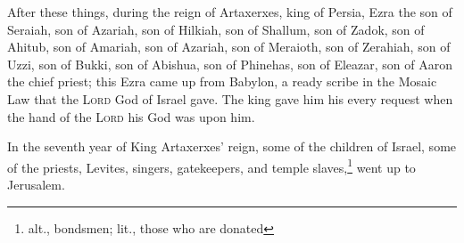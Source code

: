 
\begin{inparaenum}
     After these things, during the reign of Artaxerxes, king of Persia, Ezra the son of Seraiah, son of Azariah, son of Hilkiah,%
     son of Shallum, son of Zadok, son of Ahitub,%
     son of Amariah, son of Azariah, son of Meraioth,%
     son of Zerahiah, son of Uzzi, son of Bukki,%
     son of Abishua, son of Phinehas, son of Eleazar, son of Aaron the chief priest;%
     this Ezra came up from Babylon, a ready scribe in the Mosaic Law that the \textsc{Lord} God of Israel gave. The king gave him his every request when the hand of the \textsc{Lord} his God was upon him.%
    
     In the seventh year of King Artaxerxes' reign, some of the children of Israel, some of the priests, Levites, singers, gatekeepers, and temple slaves,\footnote{alt., bondsmen; lit., those who are donated} went up to Jerusalem.%
    
    

\end{inparaenum}
